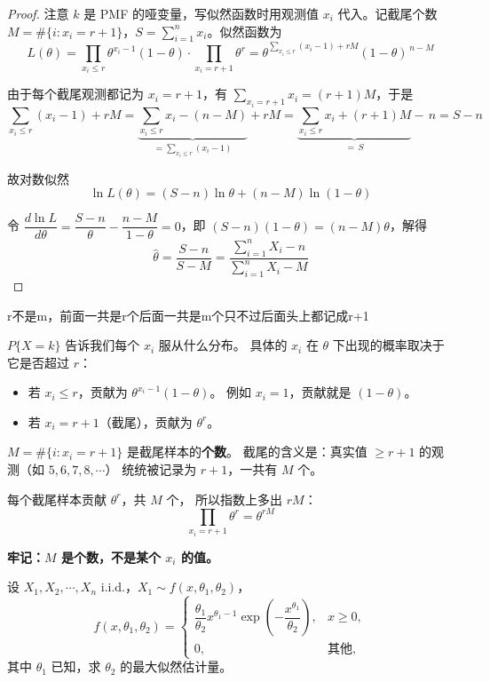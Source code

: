 \begin{proof}
注意 $k$ 是 PMF 的哑变量，写似然函数时用观测值 $x_i$ 代入。记截尾个数
$M=\#\{i: x_i=r+1\}$，$S=\sum_{i=1}^n x_i$。似然函数为
\[
L(\theta)=\prod_{x_i\le r}\theta^{x_i-1}(1-\theta)\cdot\prod_{x_i=r+1}\theta^{r}
=\theta^{\sum_{x_i\le r}(x_i-1)+rM}(1-\theta)^{\,n-M}
\]

由于每个截尾观测都记为 $x_i=r+1$，有 $\sum_{x_i=r+1}x_i=(r+1)M$，于是
\[
\sum_{x_i\le r}(x_i-1)+rM
=\underbrace{\sum_{x_i\le r}x_i-(n-M)}_{=\sum_{x_i\le r}(x_i-1)}+rM
=\underbrace{\sum_{x_i\le r}x_i+(r+1)M}_{=\,S}-\,n
=S-n
\]

故对数似然
\[
\ln L(\theta)=(S-n)\ln\theta+(n-M)\ln(1-\theta)
\]

令 $\dfrac{d\ln L}{d\theta}=\dfrac{S-n}{\theta}-\dfrac{n-M}{1-\theta}=0$，即 $(S-n)(1-\theta)=(n-M)\theta$，解得
\[
\hat\theta=\frac{S-n}{S-M}=\frac{\sum_{i=1}^n X_i-n}{\sum_{i=1}^n X_i-M}
\]
\end{proof}
\begin{dxtips}
    r不是m，前面一共是r个后面一共是m个只不过后面头上都记成r+1
\end{dxtips}
\begin{dxtips}

$P\{X=k\}$ 告诉我们每个 $x_i$ 服从什么分布。
具体的 $x_i$ 在 $\theta$ 下出现的概率取决于它是否超过 $r$：

\begin{itemize}
    \item 若 $x_i \leq r$，贡献为 $\theta^{x_i-1}(1-\theta)$。
    例如 $x_i=1$，贡献就是 $(1-\theta)$。
    \item 若 $x_i = r+1$（截尾），贡献为 $\theta^r$。
\end{itemize}

$M = \#\{i: x_i = r+1\}$ 是截尾样本的\textbf{个数}。
截尾的含义是：真实值 $\geq r+1$ 的观测（如 $5,6,7,8,\cdots$）
统统被记录为 $r+1$，一共有 $M$ 个。

每个截尾样本贡献 $\theta^r$，共 $M$ 个，
所以指数上多出 $rM$：
\[
\prod_{x_i = r+1} \theta^r = \theta^{rM}
\]

\textbf{牢记：$M$ 是个数，不是某个 $x_i$ 的值。}

\end{dxtips}
\begin{homework}[12]
设 \(X_1,X_2,\cdots,X_n\) i.i.d.，\(X_1\sim f(x,\theta_1,\theta_2)\)，
\[
f(x,\theta_1,\theta_2)=
\begin{cases}
\dfrac{\theta_1}{\theta_2}x^{\theta_1-1}\exp\!\left(-\dfrac{x^{\theta_1}}{\theta_2}\right), & x\ge 0,\\[1ex]
0, & \text{其他},
\end{cases}
\]
其中 \(\theta_1\) 已知，求 \(\theta_2\) 的最大似然估计量。
\end{homework}

